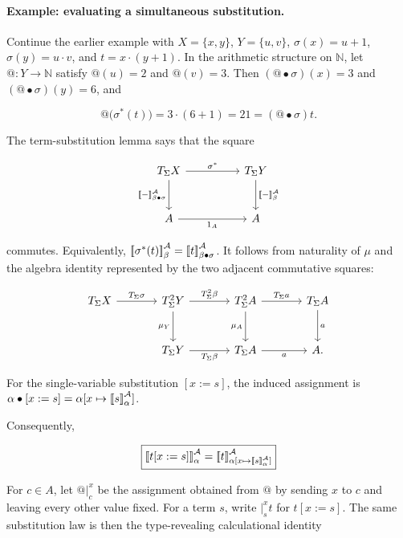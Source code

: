 \documentclass[11pt]{article}
\makeatletter
\newcommand{\llbracket}{\mathopen{[\mkern-3mu[}}
\newcommand{\rrbracket}{\mathclose{]\mkern-3mu]}}
\newcommand{\atsign}{\mathord{@}}
\theoremstyle{definition}
\makeatother
\begin{document}
\paragraph{Example: evaluating a simultaneous substitution.}
Continue the earlier example with \(X=\{x,y\}\), \(Y=\{u,v\}\),
\(\sigma(x)=u+1\), \(\sigma(y)=u\cdot v\), and
\(t=x\cdot(y+1)\). In the arithmetic structure on \(\mathbb N\), let
\(\atsign:Y\to\mathbb N\) satisfy \(\atsign(u)=2\) and \(\atsign(v)=3\).
Then \((\atsign\bullet\sigma)(x)=3\) and
\((\atsign\bullet\sigma)(y)=6\), and

\[
\atsign\bigl(\sigma^*(t)\bigr)
=3\cdot(6+1)=21
= (\atsign\bullet\sigma)t.
\]

The term-substitution lemma says
that the square

\[
\begin{tikzcd}[row sep=large,column sep=huge]
T_\Sigma X
  \arrow[r,"\sigma^*"]
  \arrow[d,"\llbracket-\rrbracket^{\mathcal A}_{\beta\bullet\sigma}"'] &
T_\Sigma Y
  \arrow[d,"\llbracket-\rrbracket^{\mathcal A}_{\beta}"] \\
A \arrow[r,"1_A"'] & A
\end{tikzcd}
\]

commutes. Equivalently,
\(\llbracket\sigma^*(t)\rrbracket^{\mathcal A}_\beta=
\llbracket t\rrbracket^{\mathcal A}_{\beta\bullet\sigma}\).
It follows from naturality of \(\mu\) and the algebra identity represented by
the two adjacent commutative squares:

\[
\begin{tikzcd}[row sep=large,column sep=large]
T_\Sigma X \arrow[r,"T_\Sigma\sigma"] &
T_\Sigma^2Y
  \arrow[r,"T_\Sigma^2\beta"]
  \arrow[d,"\mu_Y"'] &
T_\Sigma^2A
  \arrow[r,"T_\Sigma a"]
  \arrow[d,"\mu_A"'] &
T_\Sigma A \arrow[d,"a"] \\
& T_\Sigma Y
  \arrow[r,"T_\Sigma\beta"'] &
T_\Sigma A \arrow[r,"a"'] & A.
\end{tikzcd}
\]

For the single-variable substitution \([x:=s]\), the induced assignment is
\(\alpha\bullet[x:=s]=
\alpha[x\mapsto\llbracket s\rrbracket^{\mathcal A}_\alpha]\).

Consequently,

\[
\boxed{
\llbracket t[x:=s]\rrbracket^{\mathcal A}_\alpha
=
\llbracket t\rrbracket^{\mathcal A}_{
\alpha[x\mapsto\llbracket s\rrbracket^{\mathcal A}_\alpha]}
}
\]

For \(c\in A\), let \(\atsign\vert_c^x\) be the assignment obtained from
\(\atsign\) by sending \(x\) to \(c\) and leaving every other value fixed.
For a term \(s\), write \(\vert_s^x t\) for \(t[x:=s]\). The same substitution law is then the
type-revealing calculational identity
\end{document}
